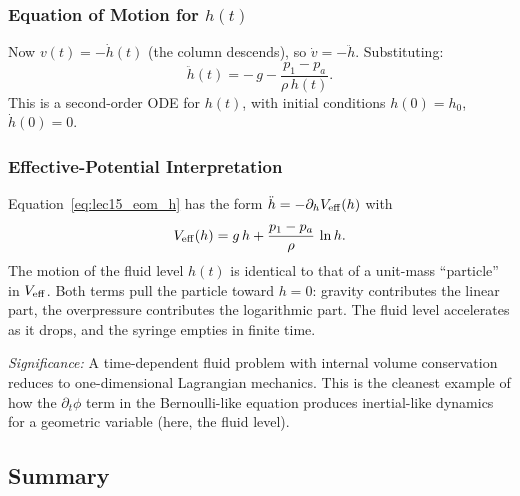 \documentclass[../main.tex]{subfiles}
\begin{document}
\subsubsection{Equation of Motion for $h(t)$}

Now $v(t) = -\dot h(t)$ (the column descends), so $\dot v = -\ddot h$. Substituting:
\begin{equation}
  \boxed{\ddot h(t) = -\,g - \frac{p_1 - p_a}{\rho\,h(t)}.}
  \label{eq:lec15_eom_h}
\end{equation}
This is a second-order ODE for $h(t)$, with initial conditions $h(0)=h_0$, $\dot h(0)=0$.

\subsubsection{Effective-Potential Interpretation}

Equation~\eqref{eq:lec15_eom_h} has the form $\ddot h = -\partial_h V_{\rm eff}(h)$ with
\begin{equation}
  V_{\rm eff}(h) = g\,h + \frac{p_1 - p_a}{\rho}\,\ln h.
  \label{eq:lec15_Veff}
\end{equation}
The motion of the fluid level $h(t)$ is identical to that of a unit-mass ``particle'' in $V_{\rm eff}$. Both terms pull the particle toward $h=0$: gravity contributes the linear part, the overpressure contributes the logarithmic part. The fluid level accelerates as it drops, and the syringe empties in finite time.

\textit{Significance:} A time-dependent fluid problem with internal volume conservation reduces to one-dimensional Lagrangian mechanics. This is the cleanest example of how the $\partial_t\phi$ term in the Bernoulli-like equation produces inertial-like dynamics for a geometric variable (here, the fluid level).

\subsection*{Summary}
\end{document}
